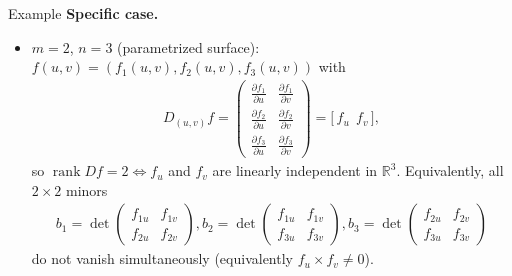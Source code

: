 \begin{frame}{Example}
\textbf{Specific case.}
\begin{itemize}
\item $m=2$, $n=3$ (parametrized surface): $f(u,v)=(f_1(u,v),f_2(u,v),f_3(u,v))$ with
\begin{align*}
D_{(u,v)} f
=\begin{pmatrix}
\frac{\partial f_1}{\partial u} & \frac{\partial f_1}{\partial v}\\[2pt]
\frac{\partial f_2}{\partial u} & \frac{\partial f_2}{\partial v}\\[2pt]
\frac{\partial f_3}{\partial u} & \frac{\partial f_3}{\partial v}
\end{pmatrix}
=\big[\,f_u\ \ f_v\,\big],
\end{align*}
so $\operatorname{rank} D f=2 \Leftrightarrow f_u$ and $f_v$ are linearly independent in $\mathbb{R}^3$.
Equivalently, all $2\times 2$ minors
\begin{align*}
b_1=\det\!\begin{pmatrix} f_{1u}&f_{1v}\\ f_{2u}&f_{2v}\end{pmatrix},
b_2=\det\!\begin{pmatrix} f_{1u}&f_{1v}\\ f_{3u}&f_{3v}\end{pmatrix},
b_3=\det\!\begin{pmatrix} f_{2u}&f_{2v}\\ f_{3u}&f_{3v}\end{pmatrix}
\end{align*}
do not vanish simultaneously (equivalently $f_u\times f_v\neq 0$).
\end{itemize}
\end{frame}

